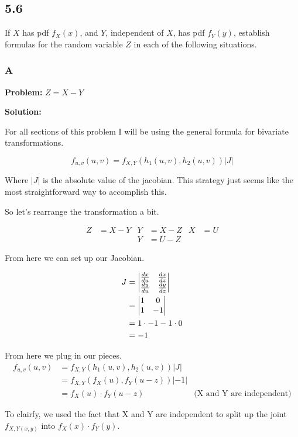 \subsection*{5.6}

If $X$ has pdf $f_X(x)$, and $Y$, independent of $X$, has pdf $f_Y(y)$, establish formulas for the random variable $Z$ in each of the following situations.

\subsubsection*{A} \textbf{Problem:} $Z = X - Y$

\noindent\textbf{Solution:}

For all sections of this problem I will be using the general formula for bivariate transformations. 

\[f_{u,v}(u,v) = f_{X,Y}(h_1(u, v), h_2(u, v)) |J|\]

Where $|J|$ is the absolute value of the jacobian. This strategy just seems like the most straightforward way to accomplish this. 

So let's rearrange the transformation a bit.

\begin{align*}
	Z &= X - Y & Y &= X - Z & X &= U \\
	&& Y &= U - Z
\end{align*}

From here we can set up our Jacobian.

\begin{align*}
	J &= \m{v}{\frac{dx}{du} & \frac{dx}{dz} \\ \frac{dy}{du} & \frac{dy}{dz}} \\
	&= \m{v}{1 & 0 \\ 1 & -1} \\
	&= 1 \cdot -1 - 1 \cdot 0 \\
	&= -1
\end{align*}

From here we plug in our pieces.
\begin{align*}
	f_{u,v}(u,v) &= f_{X,Y}(h_1(u, v), h_2(u, v)) |J| \\
	&= f_{X,Y}(f_X(u), f_Y(u-z)) |-1| \\
	&= f_X(u) \cdot f_Y(u - z) & \text{(X and Y are independent)}
\end{align*}

To clairfy, we used the fact that X and Y are independent to split up the joint $f_{X, Y(x,y)}$ into $f_X(x) \cdot f_Y(y)$. 

